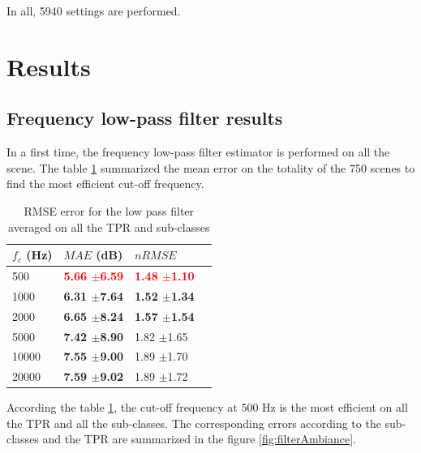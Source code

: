\documentclass[twocolumn,a4paper,10pt]{article}
\begin{document}
In all, 5940 settings are performed.

\section{Results}\label{part:results}

\subsection{Frequency low-pass filter results}
In a first time, the frequency low-pass filter estimator is performed on all the scene. The table \ref{tab:results_filter} summarized the mean error on the totality of the 750 scenes to find the most efficient cut-off frequency. \\

\begin{table}[h]
\centering
\begin{tabular}{llll}
$f_c$ (Hz) & $MAE$ (dB) & $nRMSE$  \\ \hline
 500 & \textbf{\textcolor{red}{5.66 $\pm$6.59}} & \textbf{\textcolor{red}{1.48 $\pm$1.10}} \\ 
 1000 & \textbf{6.31 $\pm$7.64} & \textbf{1.52 $\pm$1.34} \\ 
 2000 & \textbf{6.65 $\pm$8.24} & \textbf{1.57 $\pm$1.54} \\ 
 5000 & \textbf{7.42 $\pm$8.90} & 1.82 $\pm$1.65 \\ 
10000 & \textbf{7.55 $\pm$9.00} & 1.89 $\pm$1.70 \\ 
20000 & \textbf{7.59 $\pm$9.02} & 1.89 $\pm$1.72 \\ 
\end{tabular} 
\caption{RMSE error for the low pass filter averaged on all the TPR and sub-classes}
\label{tab:results_filter}
\end{table}

According the table \ref{tab:results_filter}, the cut-off frequency at 500 Hz is the most efficient on all the TPR and all the sub-classes. The corresponding errors according to the sub-classes and the TPR are summarized in the figure \ref{fig:filterAmbiance}.\\
\end{document}
